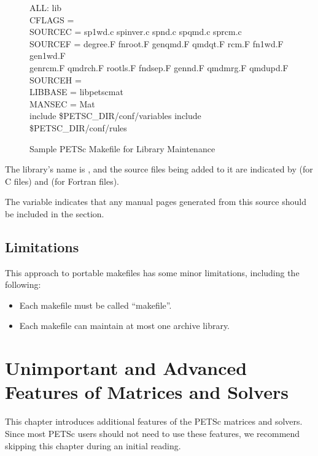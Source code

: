 {{{\begin{figure}[H]
{\small
\begin{tabbing}
   ALL: lib\\

   CFLAGS   =\\
   SOURCEC  = sp1wd.c spinver.c spnd.c spqmd.c sprcm.c\\
   SOURCEF  = degree.F  fnroot.F genqmd.F qmdqt.F rcm.F fn1wd.F gen1wd.F \ \\
              genrcm.F qmdrch.F rootls.F fndsep.F gennd.F qmdmrg.F qmdupd.F\\
   SOURCEH  = \\
   LIBBASE  = libpetscmat\\
   MANSEC   = Mat\\

   include \${PETSC\_DIR}/conf/variables
   include \${PETSC\_DIR}/conf/rules
\end{tabbing}
}
\caption{Sample PETSc Makefile for Library Maintenance}
\label{fig_make3}
\end{figure}

The library's name is , and the source files being added
to it are indicated by  (for C files) and  (for
Fortran files).

The variable  indicates that any manual pages generated
from this source should be included in the  section.

\section{Limitations}

This approach to portable makefiles has some minor limitations, including
the following:
\begin{itemize}
\item Each makefile must be called ``makefile''.
\item Each makefile can maintain at most one archive library.
\end{itemize}



\cleardoublepage
\chapter{Unimportant and Advanced Features of Matrices and Solvers}
\label{ch_advanced}

This chapter introduces additional features of the PETSc matrices and solvers.
Since most PETSc users should not need to use these features,
we recommend skipping this chapter during an initial reading.

}}}
